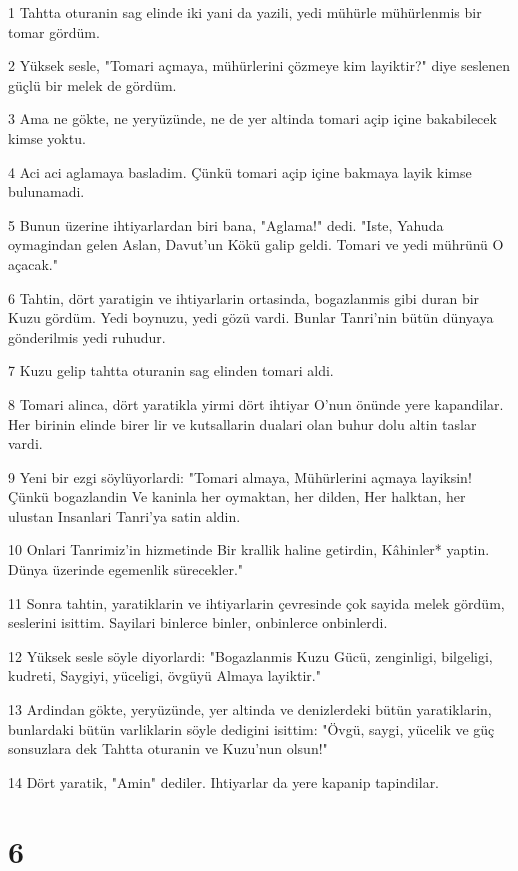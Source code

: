 \par 1 Tahtta oturanin sag elinde iki yani da yazili, yedi mühürle mühürlenmis bir tomar gördüm.
\par 2 Yüksek sesle, "Tomari açmaya, mühürlerini çözmeye kim layiktir?" diye seslenen güçlü bir melek de gördüm.
\par 3 Ama ne gökte, ne yeryüzünde, ne de yer altinda tomari açip içine bakabilecek kimse yoktu.
\par 4 Aci aci aglamaya basladim. Çünkü tomari açip içine bakmaya layik kimse bulunamadi.
\par 5 Bunun üzerine ihtiyarlardan biri bana, "Aglama!" dedi. "Iste, Yahuda oymagindan gelen Aslan, Davut'un Kökü galip geldi. Tomari ve yedi mührünü O açacak."
\par 6 Tahtin, dört yaratigin ve ihtiyarlarin ortasinda, bogazlanmis gibi duran bir Kuzu gördüm. Yedi boynuzu, yedi gözü vardi. Bunlar Tanri'nin bütün dünyaya gönderilmis yedi ruhudur.
\par 7 Kuzu gelip tahtta oturanin sag elinden tomari aldi.
\par 8 Tomari alinca, dört yaratikla yirmi dört ihtiyar O'nun önünde yere kapandilar. Her birinin elinde birer lir ve kutsallarin dualari olan buhur dolu altin taslar vardi.
\par 9 Yeni bir ezgi söylüyorlardi: "Tomari almaya, Mühürlerini açmaya layiksin! Çünkü bogazlandin Ve kaninla her oymaktan, her dilden, Her halktan, her ulustan Insanlari Tanri'ya satin aldin.
\par 10 Onlari Tanrimiz'in hizmetinde Bir krallik haline getirdin, Kâhinler* yaptin. Dünya üzerinde egemenlik sürecekler."
\par 11 Sonra tahtin, yaratiklarin ve ihtiyarlarin çevresinde çok sayida melek gördüm, seslerini isittim. Sayilari binlerce binler, onbinlerce onbinlerdi.
\par 12 Yüksek sesle söyle diyorlardi: "Bogazlanmis Kuzu Gücü, zenginligi, bilgeligi, kudreti, Saygiyi, yüceligi, övgüyü Almaya layiktir."
\par 13 Ardindan gökte, yeryüzünde, yer altinda ve denizlerdeki bütün yaratiklarin, bunlardaki bütün varliklarin söyle dedigini isittim: "Övgü, saygi, yücelik ve güç sonsuzlara dek Tahtta oturanin ve Kuzu'nun olsun!"
\par 14 Dört yaratik, "Amin" dediler. Ihtiyarlar da yere kapanip tapindilar.

\chapter{6}

